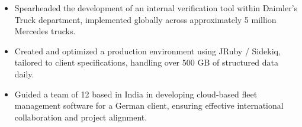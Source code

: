 \begin{minipage}{\linewidth}
\begin{itemize}
  \item Spearheaded the development of an internal verification tool within Daimler's Truck department, implemented globally across approximately 5 million Mercedes trucks.
  \item Created and optimized a production environment using JRuby / Sidekiq, tailored to client specifications, handling over 500 GB of structured data daily.
  \item Guided a team of 12 based in India in developing cloud-based fleet management software for a German client, ensuring effective international collaboration and project alignment.
\end{itemize}
\end{minipage}
\divider
